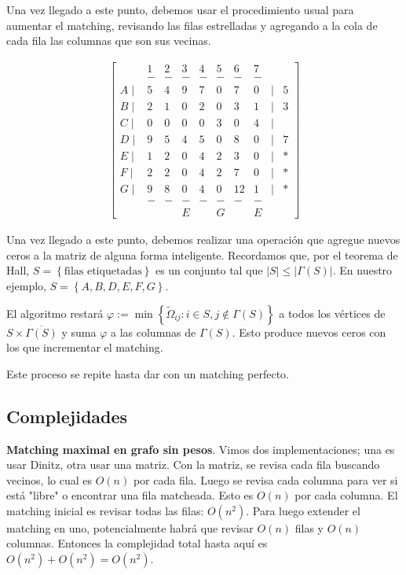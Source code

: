 \documentclass[a4paper]{article}
\begin{document}
Una vez llegado a este punto, debemos usar el procedimiento
usual para aumentar el matching, revisando las filas estrelladas 
y agregando a la cola de cada fila las columnas que son sus 
vecinas.

\begin{align*}
    \begin{bmatrix} 
        & 1 & 2 & 3 & 4 & 5 & 6 & 7 \\ 
        & - & - & - & - & - & - & -\\
        A\mid&5& 4 &9 &7 &\boxed{ 0 }  &7 &0 &\mid & 5\\ 
        B\mid&2& 1 &\boxed{ 0 }  &2 &0 &3 &1 &\mid & 3 \\ 
        C\mid&\boxed{ 0 } & 0 &0 &0 &3 &0 &4 &\mid & \\
        D\mid&9& 5 &4 &5 &0 &8 &\boxed{ 0 }  &\mid & 7\\
        E\mid&1& 2 &0 &4 &2 &3 &0 &\mid &* \\
        F\mid&2& 2 &0 &4 &2 &7 &0 &\mid &* \\
        G\mid&9& 8 &0 &4 &0 &12& 1&\mid &* \\
        & - & - & - & - & - & - & -\\
        & & & E & & G & & E
    \end{bmatrix} 
\end{align*}

Una vez llegado a este punto, debemos realizar una operación que agregue 
nuevos ceros a la matriz de alguna forma inteligente.  Recordamos que, por el 
teorema de Hall, $S = \left\{ \text{filas etiquetadas} \right\} $ es un conjunto tal que 
$|S| \leq |\Gamma(S)|$. En nuestro ejemplo, $S = \left\{ A, B, D, E, F, G \right\} $.

El algoritmo restará $\varphi := \min \left\{ \widetilde{ \Omega }_{ij} : i \in S, j \not\in \Gamma(S)  \right\} $ a 
todos los vértices de $S \times  \overline{\Gamma(S)}$ y suma $\varphi$
a las columnas de $\Gamma(S)$. Esto produce nuevos ceros con los que 
incrementar el matching. 

Este proceso se repite hasta dar con un matching perfecto.

\subsection{Complejidades}

\textbf{Matching maximal en grafo sin pesos}. Vimos dos implementaciones; una
es usar Dinitz, otra usar una matriz. Con la matriz, se revisa cada fila
buscando vecinos, lo cual es $O(n)$ por cada fila. Luego se revisa cada columna 
para ver si está "libre" o encontrar una fila matcheada. Esto es $O(n)$ por
cada columna. El matching inicial es revisar todas las filas: $O(n^2)$. Para
luego extender el matching en uno, potencialmente habrá que revisar $O(n)$
filas y $O(n)$ columnas. Entonces la complejidad total hasta aquí es $O(n^2) + O(n^2) = O(n^2)$.
\end{document}
